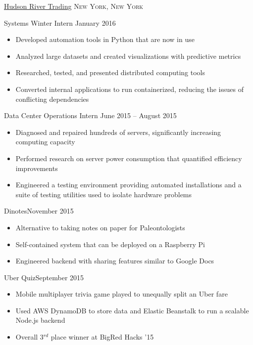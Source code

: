 \documentclass[11pt]{article}
\begin{document}
\headedsection  %
{\href{http://www.hudson-trading.com/}{Hudson River Trading}}
{\textsc{New York, New York}} {
    \headedsubsection
    {Systems Winter Intern}
    {January 2016}
    {
        \begin{itemize}
            \item Developed automation tools in Python that are now in use
            \item Analyzed large datasets and created visualizations with predictive metrics
            \item Researched, tested, and presented distributed computing tools
            \item Converted internal applications to run containerized, reducing the issues of conflicting dependencies
        \end{itemize}
    }
}

\headedsection  %
{}
{} {
    \headedsubsection
    {Data Center Operations Intern}
    {June 2015 -- August 2015}
    {
        \begin{itemize}
            \item Diagnosed and repaired hundreds of servers, significantly increasing computing capacity
            \item Performed research on server power consumption that quantified efficiency improvements
            \item Engineered a testing environment providing automated installations and a suite of testing utilities used to isolate hardware problems
        \end{itemize}
    }
}


\spacedhrule{0.1em}{0.9em}  %

\headedsubsection
{Dinotes}{November 2015}
{
    \begin{itemize}[leftmargin=0.5in]
        \item{Alternative to taking notes on paper for Paleontologists}
        \item{Self-contained system that can be deployed on a Raspberry Pi}
        \item{Engineered backend with sharing features similar to Google Docs}
    \end{itemize}
}

\headedsubsection
{Uber Quiz}{September 2015}
{
    \begin{itemize}[leftmargin=0.5in]
        \item{Mobile multiplayer trivia game played to unequally split an Uber fare}
        \item{Used AWS DynamoDB to store data and Elastic Beanstalk to run a scalable Node.js backend}
        \item{Overall 3$^{rd}$ place winner at BigRed Hacks '15}
    \end{itemize}
}
\end{document}
